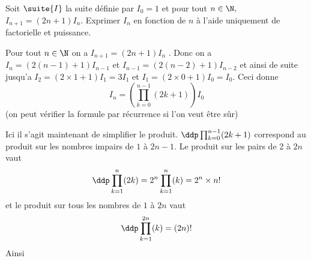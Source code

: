 



\begin{exercice}
Soit $\suite{I}$ la suite définie par $I_0=1$ et pour tout $n\in \N,$ $I_{n+1} =(2n+1)I_n$.
Exprimer $I_n$ en fonction de $n$ à l'aide uniquement de factorielle et puissance. 
\end{exercice}



\begin{correction}
Pour tout $n\in \N$ on a $I_{n+1} = (2n+1)I_n$ . Donc on a 
$I_n =(2(n-1) +1) I_{n-1}$ et $I_{n-1} =(2(n-2) +1) I_{n-2}$ et ainsi de suite jusqu'a $I_2 =(2\times 1+1) I_1=3I_1$ et $I_1 =(2\times 0+1) I_0 =I_0$. 
Ceci donne 
$$I_{n} = \left(\prod_{k=0}^{n-1} (2k+1) \right)I_0$$
(on peut vérifier la formule par récurrence si l'on veut être sûr) 

Ici il s'agit maintenant de simplifier le produit. 
$\ddp \prod_{k=0}^{n-1} (2k+1) $ correspond au produit sur les nombres impairs de $1$ à $2n-1$. Le produit sur les pairs de 2 à $2n$  vaut 
$$\ddp  \prod_{k=1}^{n} (2k)  = 2^n   \prod_{k=1}^{n} (k)  = 2^n \times n! $$
et le produit sur tous les nombres de $1$ à $2n$ vaut 
$$\ddp  \prod_{k=1}^{2n} (k)  =   (2n)! $$
Ainsi 
\end{correction}